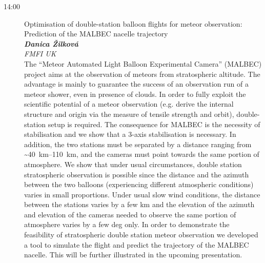 \documentclass[a4paper]{report}
\begin{document}
        \begin{description}
                            \item[14:00]
                    {\Large Optimisation of double-station balloon flights for meteor observation: Prediction of the MALBEC nacelle trajectory} \\[1ex]
                                            \textit{\textbf{Danica Žilková}} \\%
                                        \textit{FMFI UK} \\[1ex]                    The “Meteor Automated Light Balloon Experimental Camera” (MALBEC) project aims at the observation of meteors from stratospheric altitude. The advantage is mainly to guarantee the success of an observation run of a meteor shower, even in presence of clouds. In order to fully exploit the scientific potential of a meteor observation (e.g. derive the internal structure and origin via the measure of tensile strength and orbit), double-station setup is required. The consequence for MALBEC is the necessity of stabilisation and we show that a 3-axis stabilisation is necessary. In addition, the two stations must be separated by a distance ranging from \textasciitilde\SIrange{40}{110}{\kilo\metre}, and the cameras must point towards the same portion of atmosphere. We show that under usual circumstances, double station stratospheric observation is possible since the distance and the azimuth between the two balloons (experiencing different atmospheric conditions) varies in small proportions. Under usual slow wind conditions, the distance between the stations varies by a few km and the elevation of the azimuth and elevation of the cameras needed to observe the same portion of atmosphere varies by a few deg only. In order to demonstrate the feasibility of stratospheric double station meteor observation we developed a tool to simulate the flight and predict the trajectory of the MALBEC nacelle. This will be further illustrated in the upcoming presentation.
 \\                    
                    \end{description}
\end{document}
